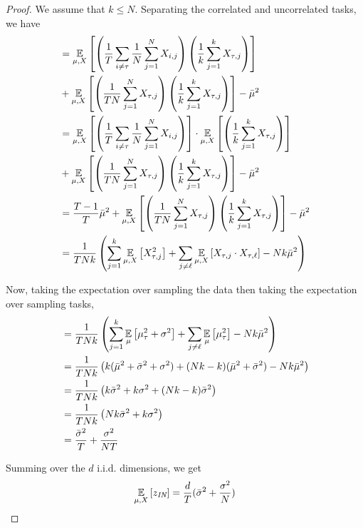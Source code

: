 \begin{proof}
We assume that $k \leq N$. Separating the correlated and uncorrelated tasks, we have
\begin{align*}
    &= \ex{\mu, X}{ \left( \frac{1}{T} \sum_{i \neq \tau}  \frac{1}{N} \sum_{j=1}^{N} X_{i,j} \right) \left( \frac{1}{k} \sum_{j=1}^{k} X_{\tau , j} \right) }  \\ &+   
    {\ex{\mu, X}{\left( \frac{1}{TN} \sum_{j=1}^{N} X_{\tau,j} \right) \left( \frac{1}{k} \sum_{j=1}^{k} X_{\tau,j} \right)} } - \mubar^2  \\ 
    &= \ex{\mu, X}{ \left( \frac{1}{T} \sum_{i \neq \tau}  \frac{1}{N} \sum_{j=1}^{N} X_{i,j} \right)} \cdot \ex{\mu, X}{\left( \frac{1}{k} \sum_{j=1}^{k} X_{\tau , j} \right) } \\ &+  
    {\ex{\mu, X}{\left( \frac{1}{TN} \sum_{j=1}^{N} X_{\tau,j} \right) \left( \frac{1}{k} \sum_{j=1}^{k} X_{\tau,j} \right)} } - \mubar^2  \\ 
    &= \frac{T-1}{T} \mubar^2 + {\ex{\mu, X}{\left( \frac{1}{TN} \sum_{j=1}^{N} X_{\tau,j} \right) \left( \frac{1}{k} \sum_{j=1}^{k} X_{\tau,j} \right)} } - \mubar^2  \\ 
    &=  \frac{1}{TNk} \left( {\sum_{j=1}^{k}\ex{\mu, X}{ X_{\tau,j}^{2}}  + \sum_{j \neq \ell} \ex{\mu, X}{ X_{\tau,j} \cdot X_{\tau, \ell} } }  -  Nk \mubar^2  \right)
\end{align*}

Now, taking the expectation over sampling the data then taking the expectation over sampling tasks,
\begin{align*}
    &=  \frac{1}{TNk} \left( {\sum_{j=1}^{k}\ex{\mu}{ \mu_{\tau}^{2} + \sigma^{2} }  + \sum_{j \neq \ell} \ex{\mu}{ \mu_{\tau}^{2} } }  -  Nk \mubar^2  \right)  \\ 
    &=  \frac{1}{TNk} \left(  k (\mubar^{2} + \bar{\sigma}^{2} + \sigma^{2})  + (Nk - k)  (\mubar^{2} + \bar{\sigma}^{2})    -  Nk \mubar^2  \right) \\ 
    &=  \frac{1}{TNk} \left(    k \bar{\sigma}^{2} + k\sigma^{2}  + (Nk - k)  \bar{\sigma}^{2}    \right)  \\ 
    &=  \frac{1}{TNk} \left(      Nk \bar{\sigma}^{2} + k\sigma^{2}    \right)  \\ 
    &=  \frac{\bar{\sigma}^{2}}{T} + \frac{\sigma^{2}}{NT}
\end{align*}


Summing over the $d$ i.i.d. dimensions, we get 
\[
\ex{\mu, X}{z_{\textit{IN}}} = \frac{d}{T} (\bar{\sigma}^{2} + \frac{\sigma^{2}}{N})
\]


\end{proof}

